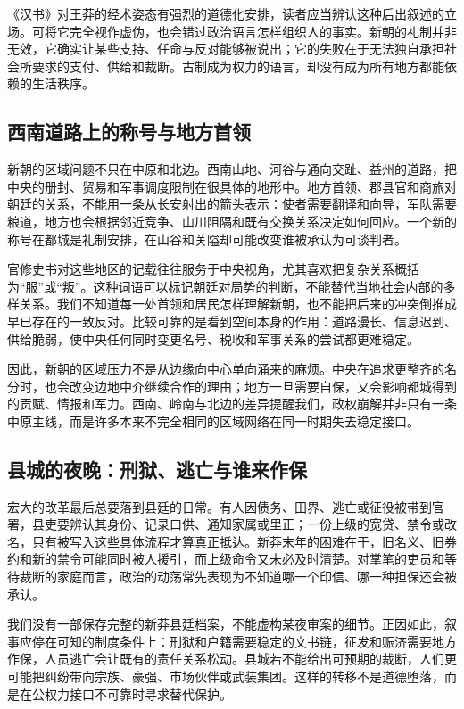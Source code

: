 《汉书》对王莽的经术姿态有强烈的道德化安排，读者应当辨认这种后出叙述的立场。可将它完全视作虚伪，也会错过政治语言怎样组织人的事实。新朝的礼制并非无效，它确实让某些支持、任命与反对能够被说出；它的失败在于无法独自承担社会所要求的支付、供给和裁断。古制成为权力的语言，却没有成为所有地方都能依赖的生活秩序。

\subsection{西南道路上的称号与地方首领}

新朝的区域问题不只在中原和北边。西南山地、河谷与通向交趾、益州的道路，把中央的册封、贸易和军事调度限制在很具体的地形中。地方首领、郡县官和商旅对朝廷的关系，不能用一条从长安射出的箭头表示：使者需要翻译和向导，军队需要粮道，地方也会根据邻近竞争、山川阻隔和既有交换关系决定如何回应。一个新的称号在都城是礼制安排，在山谷和关隘却可能改变谁被承认为可谈判者。

官修史书对这些地区的记载往往服务于中央视角，尤其喜欢把复杂关系概括为“服”或“叛”。这种词语可以标记朝廷对局势的判断，不能替代当地社会内部的多样关系。我们不知道每一处首领和居民怎样理解新朝，也不能把后来的冲突倒推成早已存在的一致反对。比较可靠的是看到空间本身的作用：道路漫长、信息迟到、供给脆弱，使中央任何同时变更名号、税收和军事关系的尝试都更难稳定。

因此，新朝的区域压力不是从边缘向中心单向涌来的麻烦。中央在追求更整齐的名分时，也会改变边地中介继续合作的理由；地方一旦需要自保，又会影响都城得到的贡赋、情报和军力。西南、岭南与北边的差异提醒我们，政权崩解并非只有一条中原主线，而是许多本来不完全相同的区域网络在同一时期失去稳定接口。

\subsection{县城的夜晚：刑狱、逃亡与谁来作保}

宏大的改革最后总要落到县廷的日常。有人因债务、田界、逃亡或征役被带到官署，县吏要辨认其身份、记录口供、通知家属或里正；一份上级的宽贷、禁令或改名，只有被写入这些具体流程才算真正抵达。新莽末年的困难在于，旧名义、旧券约和新的禁令可能同时被人援引，而上级命令又未必及时清楚。对掌笔的吏员和等待裁断的家庭而言，政治的动荡常先表现为不知道哪一个印信、哪一种担保还会被承认。

我们没有一部保存完整的新莽县廷档案，不能虚构某夜审案的细节。正因如此，叙事应停在可知的制度条件上：刑狱和户籍需要稳定的文书链，征发和赈济需要地方作保，人员逃亡会让既有的责任关系松动。县城若不能给出可预期的裁断，人们更可能把纠纷带向宗族、豪强、市场伙伴或武装集团。这样的转移不是道德堕落，而是在公权力接口不可靠时寻求替代保护。

